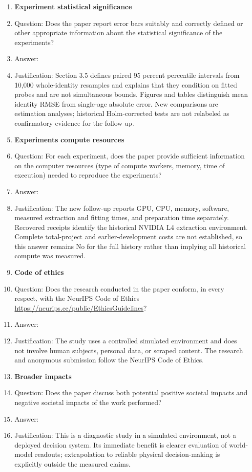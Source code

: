 \begin{enumerate}
\item {\bf Experiment statistical significance}
    \item[] Question: Does the paper report error bars suitably and correctly defined or other appropriate information about the statistical significance of the experiments?
    \item[] Answer: \answerYes{}
    \item[] Justification: Section 3.5 defines paired 95 percent percentile intervals from 10,000 whole-identity resamples and explains that they condition on fitted probes and are not simultaneous bounds. Figures and tables distinguish mean identity RMSE from single-age absolute error. New comparisons are estimation analyses; historical Holm-corrected tests are not relabeled as confirmatory evidence for the follow-up.


\item {\bf Experiments compute resources}
    \item[] Question: For each experiment, does the paper provide sufficient information on the computer resources (type of compute workers, memory, time of execution) needed to reproduce the experiments?
    \item[] Answer: \answerNo{}
    \item[] Justification: The new follow-up reports GPU, CPU, memory, software, measured extraction and fitting times, and preparation time separately. Recovered receipts identify the historical NVIDIA L4 extraction environment. Complete total-project and earlier-development costs are not established, so this answer remains No for the full history rather than implying all historical compute was measured.


\item {\bf Code of ethics}
    \item[] Question: Does the research conducted in the paper conform, in every respect, with the NeurIPS Code of Ethics \url{https://neurips.cc/public/EthicsGuidelines}?
    \item[] Answer: \answerYes{}
    \item[] Justification: The study uses a controlled simulated environment and does not involve human subjects, personal data, or scraped content. The research and anonymous submission follow the NeurIPS Code of Ethics.


\item {\bf Broader impacts}
    \item[] Question: Does the paper discuss both potential positive societal impacts and negative societal impacts of the work performed?
    \item[] Answer: \answerNA{}
    \item[] Justification: This is a diagnostic study in a simulated environment, not a deployed decision system. Its immediate benefit is clearer evaluation of world-model readouts; extrapolation to reliable physical decision-making is explicitly outside the measured claims.



\end{enumerate}
